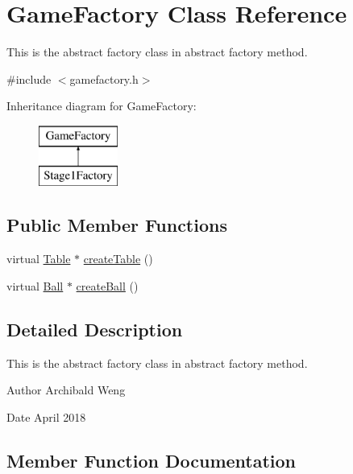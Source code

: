 \hypertarget{class_game_factory}{}\section{Game\+Factory Class Reference}
\label{class_game_factory}


This is the abstract factory class in abstract factory method.  




{\ttfamily \#include $<$gamefactory.\+h$>$}

Inheritance diagram for Game\+Factory\+:\begin{figure}[H]
\begin{center}
\leavevmode
\includegraphics[height=2.000000cm]{class_game_factory}
\end{center}
\end{figure}
\subsection*{Public Member Functions}
\begin{DoxyCompactItemize}
\item 
virtual \mbox{\hyperlink{class_table}{Table}} $\ast$ \mbox{\hyperlink{class_game_factory_ac2e32aa1f1c55aae847745575afb0583}{create\+Table}} ()
\item 
virtual \mbox{\hyperlink{class_ball}{Ball}} $\ast$ \mbox{\hyperlink{class_game_factory_aae6fcb1b85abc73e3370246fdf77b7a8}{create\+Ball}} ()
\end{DoxyCompactItemize}


\subsection{Detailed Description}
This is the abstract factory class in abstract factory method. 

\begin{DoxyAuthor}{Author}
Archibald Weng 
\end{DoxyAuthor}
\begin{DoxyDate}{Date}
April 2018 
\end{DoxyDate}


\subsection{Member Function Documentation}
\mbox{\label{class_game_factory_aae6fcb1b85abc73e3370246fdf77b7a8}} 
